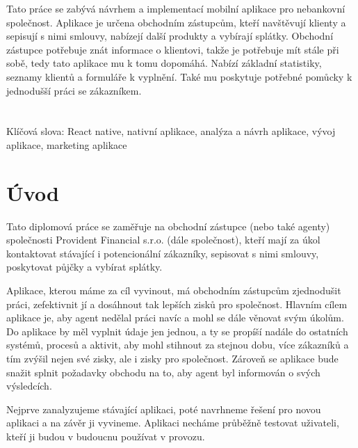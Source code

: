 \documentclass[11pt,twoside,a4paper]{book}
\begin{document}
\newpage
	\baselineskip

	\noindent

	Tato práce se zabývá návrhem a implementací mobilní aplikace pro nebankovní společnost. Aplikace je určena obchodním zástupcům, kteří navštěvují klienty a sepisují s nimi smlouvy, nabízejí další produkty a vybírají splátky. Obchodní zástupce potřebuje znát informace o klientovi, takže je potřebuje mít stále při sobě, tedy tato aplikace mu k tomu dopomáhá. Nabízí základní statistiky, seznamy klientů a formuláře k vyplnění. Také mu poskytuje potřebné pomůcky k jednodušší práci se zákazníkem.\\
	\\\\
	Klíčová slova: React native, nativní aplikace, analýza a návrh aplikace, vývoj aplikace, marketing aplikace
	\noindent

	\tableofcontents		%

	\listoffigures			%

	\mainbodystarts

\chapter{Úvod}
Tato diplomová práce se zaměřuje na obchodní zástupce (nebo také agenty) společnosti Provident Financial s.r.o. (dále společnost), kteří mají za úkol kontaktovat stávající i potencionální zákazníky, sepisovat s nimi smlouvy, poskytovat půjčky a vybírat splátky.

Aplikace, kterou máme za cíl vyvinout, má obchodním zástupcům zjednodušit práci, zefektivnit jí a dosáhnout tak lepších zisků pro společnost. Hlavním cílem aplikace je, aby agent nedělal práci navíc a mohl se dále věnovat svým úkolům. Do aplikace by měl vyplnit údaje jen jednou, a ty se propíší nadále do ostatních systémů, procesů a aktivit, aby mohl stihnout za stejnou dobu, více zákazníků a tím zvýšil nejen své zisky, ale i zisky pro společnost. Zároveň se aplikace bude snažit splnit požadavky obchodu na to, aby agent byl informován o svých výsledcích.

Nejprve zanalyzujeme stávající aplikaci, poté navrhneme řešení pro novou aplikaci a na závěr ji vyvineme. Aplikaci necháme průběžně testovat uživateli, kteří ji budou v budoucnu používat v provozu.
\end{document}
